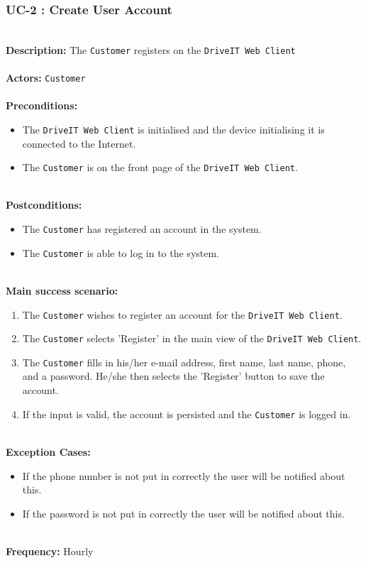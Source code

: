 \subsubsection{UC-2 : Create User Account}
\label{create-account-use-case}
\HRule \\[0.4cm]
\textbf{Description:} The \texttt{Customer} registers on the \texttt{DriveIT Web Client} \\
\HRule \\[0.4cm]
\textbf{Actors:} \texttt{Customer}\\
\HRule \\[0.4cm]
\textbf{Preconditions:} 
\begin{itemize}
    \item  The \texttt{DriveIT Web Client} is initialised and the device initialising it is connected to the Internet.
    \item  The \texttt{Customer} is on the front page of the \texttt{DriveIT Web Client}.
\end{itemize}
\HRule \\[0.4cm]
\textbf{Postconditions:}
\begin{itemize}
    \item The \texttt{Customer} has registered an account in the system.
    \item The \texttt{Customer} is able to log in to the system.
\end{itemize}
\HRule \\[0.4cm]
\textbf{Main success scenario:}
\begin{enumerate}
    \item  The \texttt{Customer} wishes to register an account for the \texttt{DriveIT Web Client}.
    \item  The \texttt{Customer} selects 'Register' in the main view of the \texttt{DriveIT Web Client}.
    \item  The \texttt{Customer} fills in his/her e-mail address, first name, last name, phone, and a password. He/she then selects the 'Register' button to save the account.
    \item  If the input is valid, the account is persisted and the \texttt{Customer} is logged in.
\end{enumerate}
\HRule \\[0.4cm]
\textbf{Exception Cases:}
\begin{itemize}
	\item If the phone number is not put in correctly the user will be notified about this.
	\item If the password is not put in correctly the user will be notified about this.
\end{itemize}
\HRule \\[0.4cm]
\textbf{Frequency:}
Hourly \\
\HRule \\[0.4cm]

